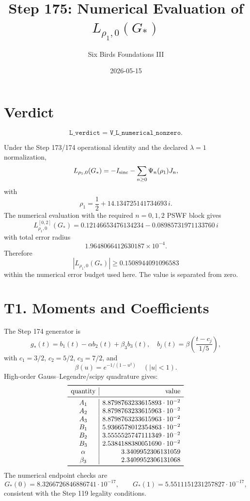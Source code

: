 \documentclass[11pt]{article}
\title{Step 175: Numerical Evaluation of \(L_{\rho_1,0}(G_*)\)}
\author{Six Birds Foundations III}
\date{2026-05-15}
\begin{document}
\maketitle

\section{Verdict}

\[
\boxed{\texttt{L\_verdict = V\_L\_numerical\_nonzero}.}
\]

Under the Step 173/174 operational identity and the declared \(\lambda=1\)
normalization,
\[
L_{\rho_1,0}(G_*)
=-I_{\rm sinc}-\sum_{n\ge0}\Psi_n(\rho_1)J_n,
\]
with
\[
\rho_1=\frac12+14.134725141734693\,i.
\]
The numerical evaluation with the required \(n=0,1,2\) PSWF block gives
\[
\boxed{
L_{\rho_1,0}^{[0,2]}(G_*)
=0.12146653476134234
-0.08985731971133760\,i
}
\]
with total error radius
\[
\boxed{1.9648066412630187\times 10^{-4}.}
\]
Therefore
\[
\boxed{|L_{\rho_1,0}(G_*)|\ge 0.1508944091096583}
\]
within the numerical error budget used here.  The value is separated from zero.

\section{T1. Moments and Coefficients}

The Step 174 generator is
\[
g_*(t)=b_1(t)-\alpha b_2(t)+\beta_3 b_3(t),
\quad
b_j(t)=\beta\!\left(\frac{t-c_j}{1/5}\right),
\]
with \(c_1=3/2\), \(c_2=5/2\), \(c_3=7/2\), and
\[
\beta(u)=e^{-1/(1-u^2)}\quad (|u|<1).
\]
High-order Gauss--Legendre/scipy quadrature gives:
\[
\begin{array}{c|r}
\toprule
\text{quantity} & \text{value}\\
\midrule
A_1 & 8.8798763233615893\cdot10^{-2}\\
A_2 & 8.8798763233615963\cdot10^{-2}\\
A_3 & 8.8798763233615963\cdot10^{-2}\\
B_1 & 5.9366578012354863\cdot10^{-2}\\
B_2 & 3.5555525747111349\cdot10^{-2}\\
B_3 & 2.5384188380051690\cdot10^{-2}\\
\alpha & 3.3409952306131059\\
\beta_3 & 2.3409952306131068\\
\bottomrule
\end{array}
\]
The numerical endpoint checks are
\[
G_*(0)=8.3266726846886741\cdot10^{-17},
\qquad
G_*(1)=5.5511151231257827\cdot10^{-17},
\]
consistent with the Step 119 legality conditions.
\end{document}
